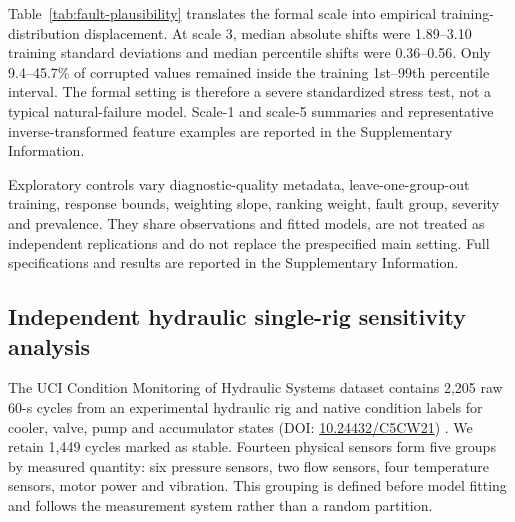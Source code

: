 \documentclass[11pt]{article}
\begin{document}
Table~\ref{tab:fault-plausibility} translates the formal scale into empirical training-distribution displacement. At scale 3, median absolute shifts were 1.89--3.10 training standard deviations and median percentile shifts were 0.36--0.56. Only 9.4--45.7\% of corrupted values remained inside the training 1st--99th percentile interval. The formal setting is therefore a severe standardized stress test, not a typical natural-failure model. Scale-1 and scale-5 summaries and representative inverse-transformed feature examples are reported in the Supplementary Information.

\begin{table}[ht]
\centering
\caption{Fault-plausibility audit in the strict subset. Fractions are calculated featurewise against batches 1--6. ``Training range'' denotes the observed training minimum--maximum, not a physical sensor limit.}
\label{tab:fault-plausibility}
\resizebox{0.94\textwidth}{!}{}
\end{table}

Exploratory controls vary diagnostic-quality metadata, leave-one-group-out training, response bounds, weighting slope, ranking weight, fault group, severity and prevalence. They share observations and fitted models, are not treated as independent replications and do not replace the prespecified main setting. Full specifications and results are reported in the Supplementary Information.

\subsection{Independent hydraulic single-rig sensitivity analysis}

The UCI Condition Monitoring of Hydraulic Systems dataset contains 2,205 raw 60-s cycles from an experimental hydraulic rig and native condition labels for cooler, valve, pump and accumulator states (DOI: \href{https://doi.org/10.24432/C5CW21}{10.24432/C5CW21}) \citep{helwig2018hydraulic,helwig2015condition}. We retain 1,449 cycles marked as stable. Fourteen physical sensors form five groups by measured quantity: six pressure sensors, two flow sensors, four temperature sensors, motor power and vibration. This grouping is defined before model fitting and follows the measurement system rather than a random partition.
\end{document}
